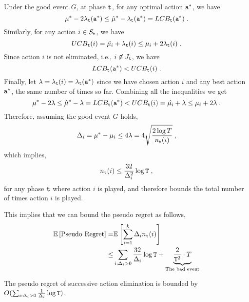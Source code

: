 Under the good event $G$, at phase ${\tt t}$, for any optimal action ${\tt a}^*$, we have
\[
\mu^{*}-2\lambda_{\tt t}({\tt a}^*)\le\hat{\mu}^{*}-\lambda_{\tt t}({\tt a}^*)=LCB_{\tt t}({\tt a}^*)\;.
\]
Similarly, for any action $i\in S_{\tt t}$, we have
\[
UCB_{\tt t}(i)=\hat{\mu_{i}}+\lambda_{\tt t}(i)\leq\mu_{i}+2\lambda_{\tt t}(i)\;.
\]
Since action $i$ is not eliminated, i.e., $i\not\in J_{\tt t}$, we have
\[
LCB_{\tt t}({\tt a}^*)<UCB_{\tt t}(i)\;.
\]
Finally, let  $\lambda=\lambda_{{\tt t}}(i)=\lambda_{\tt t}({{\tt a}^*})$ since we have chosen action $i$ and any best action ${\tt a}^*$, the same number of times so far.
Combining all the inequalities we get
\[
 \mu^{*}-2\lambda\le\hat{\mu}^{*}-\lambda=LCB_{\tt t}({\tt a}^*)<UCB_{\tt t}(i)=\hat{\mu_{i}}+\lambda\leq\mu_{i}+2\lambda\;.
\]
Therefore, assuming the good event $G$ holds,
\[
\Delta_{i}=\mu^{*}-\mu_{i}\le4\lambda=4\sqrt{\frac{2\log
T}{n_{{\tt t}}(i)}}\;,
\]
which implies,
\[
 n_{{\tt t}}(i)\le\frac{32}{\Delta_{i}^{2}}\log {\tt T}\;,
\]
for any phase ${\tt t}$ where action $i$ is played, and therefore bounds the total number of times action $i$ is played.

This implies that we can bound the pseudo regret as follows,
\begin{align*}
\mathbb{E}\left[\text{Pseudo Regret}\right]  = &  \mathbb{E}\left[\sum_{i=1}^{k}\Delta_{i}n_{{\tt t}}(i)\right]\\
  \le &  \sum_{i:\Delta_i>0}\frac{32}{\Delta_{i}}\log {\tt T}
  +\underbrace{\frac{2}{{\tt T}^{2}}\cdot T}_{\text{The bad event}}
\end{align*}


\begin{theorem}
\label{thm:MAB:SE1}
The pseudo regret of successive action elimination is bounded by $O(\sum_{i:\Delta_i>0}\frac{1}{\Delta_{i}}\log {\tt T})$.
\end{theorem}

